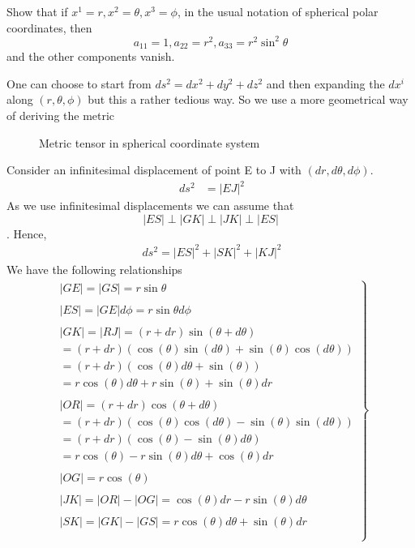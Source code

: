 \begin{tcolorbox}
Show that if $x^1 = r, x^2 = \theta, x^3 = \phi$, in the usual notation of spherical polar coordinates, then $$ a_{11} =1, a_{22} = r^2, a_{33} = r^2\sin^2\theta$$ and the other components vanish.
\end{tcolorbox}
One can choose to start from $ds^2 = dx^2+dy^2+dz^2$ and then expanding the $dx^i$ along $(r,\theta,\phi)$ but this a rather tedious way. So we use a more geometrical way of deriving the metric\\
\begin{figure}[htp] 
    \centering

\caption{Metric tensor in spherical coordinate system}
\label{fig:fig_p27_22_a}
\end{figure}
Consider an infinitesimal displacement of point E to J with $(dr,d\theta, d\phi )$.
\begin{align}
\ ds^2 &= |EJ|^2
\end{align}
As we use infinitesimal displacements we can assume that $$|ES|\perp|GK|\perp|JK|\perp|ES|$$. Hence,
\begin{align}
\ ds^2 = |ES|^2+|SK|^2+|KJ|^2
\end{align}
We have the following relationships
\begin{align}
\left.
\begin{array}{c}
\ |GE| = |GS| = r\sin\theta\\\\
\ |ES| = |GE|d\phi = r\sin\theta d\phi\\\\
\ |GK| = |RJ| = (r+dr)\sin(\theta+d\theta) \\
\ =(r+dr)(\cos(\theta)\sin(d\theta)+\sin(\theta)\cos(d\theta) )\\
\ = (r+dr)(\cos(\theta)d\theta+\sin(\theta))\\
\ = r\cos(\theta)d\theta+r\sin(\theta)+\sin(\theta)dr\\\\
\ |OR| =  (r+dr)\cos(\theta+d\theta)\\
\ = (r+dr)(\cos(\theta)\cos(d\theta)-\sin(\theta)\sin(d\theta))\\
\ = (r+dr)(\cos(\theta)-\sin(\theta)d\theta)\\
\ = r\cos(\theta)-r\sin(\theta)d\theta + \cos(\theta)dr\\\\
\ |OG| = r\cos(\theta)\\\\
\ |JK| = |OR|-|OG| = \cos(\theta)dr-r\sin(\theta)d\theta\\\\
\ |SK| = |GK|-|GS| = r\cos(\theta)d\theta+\sin(\theta)dr\\\\
\end{array}
\right\}
\end{align}
